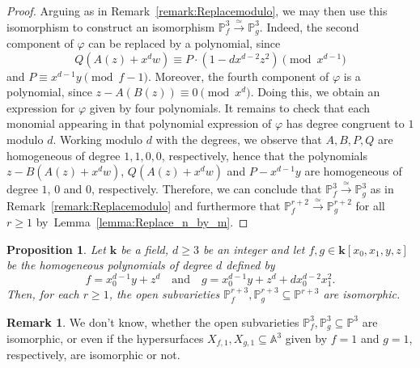 \documentclass[11pt]{article}
\newcommand\quand{\quad\text{and}\quad}
\newtheorem{proposition}[lemma]{Proposition}
\theoremstyle{definition}
\newtheorem{remark}[lemma]{Remark}
\newcommand\iso{\stackrel{\simeq}{\longrightarrow}}
\newcommand\A{{\mathbb A}}\let\AA\A
\renewcommand\k{{\mathbf k}}
\newcommand\p{{\mathbb P}}\let\PP\p
\newcommand{\kk}{\mathbf{k}}
\begin{document}
\begin{proof}
Arguing as in Remark~\ref{remark:Replacemodulo}, we may then use this isomorphism to construct an isomorphism $\p^3_f\iso \p^3_g$. Indeed, the second component of $\varphi$ can be replaced by a polynomial, since
\[
Q\left(A(z)+x^{d}w\right)\equiv P\cdot (1-dx^{d-2}z^2)\pmod{x^{d-1}}
\]
and $P\equiv x^{d-1}y\pmod{f-1}$.
Moreover, the fourth component of $\varphi$ is a polynomial, since $z-A(B(z)) \equiv 0\pmod{x^d}$.
Doing this, we obtain an expression for $\varphi$ given by four polynomials. It remains to check that each monomial appearing in that polynomial expression of $\varphi$ has degree congruent to $1$ modulo $d$. Working modulo $d$ with the degrees, we observe that $A,B,P,Q$ are homogeneous of degree $1,1,0,0$, respectively, hence that the polynomials $z-B(A(z)+x^{d}w)$, $Q(A(z)+x^dw)$ and $P-x^{d-1}y$ are homogeneous of degree $1$, $0$ and $0$, respectively. Therefore, we can conclude that $\p^3_f\iso \p^3_g$ as in Remark~\ref{remark:Replacemodulo} and furthermore that $\p^{r+2}_f\iso \p^{r+2}_g$ for all $r\geq 1$ by~Lemma~\ref{lemma:Replace_n_by_m}.
\end{proof}

\begin{proposition}
\label{Prop.Counterexample.dim4}
Let $\kk$ be a field, $d\ge 3$ be an integer and let $f,g\in\k[x_0,x_1,y,z]$ be the homogeneous polynomials of degree $d$ defined by
\[
f=x_0^{d-1}y+z^{d} \quand
g=x_0^{d-1}y+z^{d}+dx_0^{d-2}x_1^2. \]
Then, for each $r\ge 1$, the open subvarieties $\p^{r+3}_f,\p^{r+3}_g \subseteq \p^{r+3}$ are isomorphic.
\end{proposition}

\begin{remark}
We don't know, whether the open subvarieties $\p^{3}_f,\p^{3}_g \subseteq \p^{3}$ are isomorphic,
or even if the hypersurfaces $X_{f,1}, X_{g,1}\subseteq \A^3$ given by $f=1$ and $g=1$, respectively, are isomorphic or not.
\end{remark}
\end{document}
